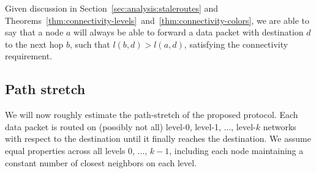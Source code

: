 \documentclass[conference]{IEEEtran}
\theoremstyle{definition}
\begin{document}
Given discussion in Section~\ref{sec:analysis:staleroutes} and Theorems~\ref{thm:connectivity-levels}~and~\ref{thm:connectivity-colors}, we are able to say that a node $a$ will always be able to forward a data packet with destination $d$ to the next hop $b$, such that $l(b,d) > l(a,d)$, satisfying the connectivity requirement.


\subsection{Path stretch}
\label{sec:analysis:stretch}

We will now roughly estimate the path-stretch of the proposed protocol. Each data packet is routed on (possibly not all) level-0, level-1, ..., level-$k$ networks with respect to the destination until it finally reaches the destination. We assume equal properties across all levels 0, ..., $k - 1$, including each node maintaining a constant number of closest neighbors on each level.
\end{document}
